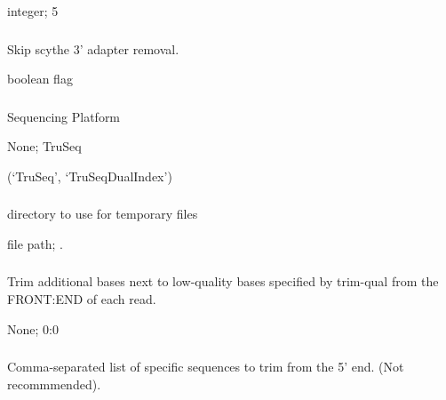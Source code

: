 \documentclass[letterpaper,11pt,english]{sphinxmanual}
\begin{document}
 integer;  5


\subsubsection{}
\label{\detokenize{prog_desc:scythe-skip}}
 Skip scythe 3’ adapter removal.

 boolean flag


\subsubsection{}
\label{\detokenize{prog_desc:t-platform}}
 Sequencing Platform

 None;  TruSeq

 (‘TruSeq’, ‘TruSeqDualIndex’)


\subsubsection{}
\label{\detokenize{prog_desc:temp-dir}}
 directory to use for temporary files

 file path;  .


\subsubsection{}
\label{\detokenize{prog_desc:trim-qual-pad}}
 Trim additional bases next to low-quality bases specified by \textendash{}trim-qual from the FRONT:END of each read.

 None;  0:0


\subsubsection{}
\label{\detokenize{prog_desc:y-trim-pattern-5}}
 Comma-separated list of specific sequences to trim from the 5’ end. (Not recommmended).
\end{document}
